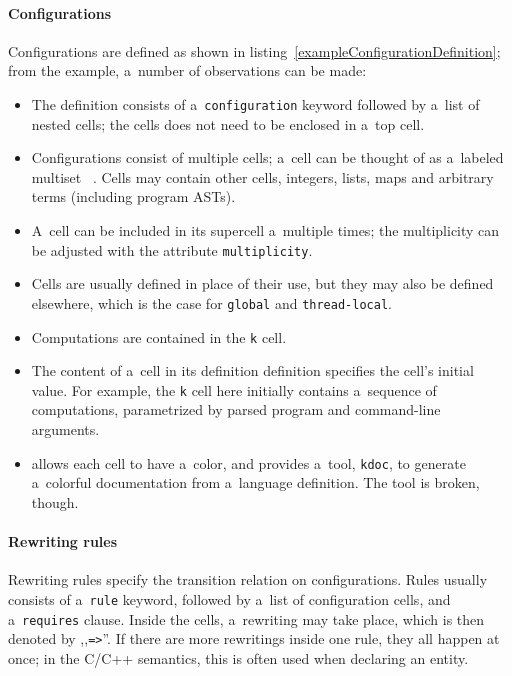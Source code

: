\documentclass{fithesis3}
\newcommand{\kdoc}{\texttt{kdoc}\xspace}
\begin{document}
\paragraph{Configurations}
Configurations are defined as shown in listing~\ref{exampleConfigurationDefinition}; from the example, a~number of observations can be made:
\begin{itemize}
\item The definition consists of a~\texttt{configuration} keyword followed by a~list of nested cells; the cells does not need to be enclosed in a~top cell.
\item Configurations consist of multiple cells; a~cell can be thought of as a~labeled multiset ~\cite{hathhorn-ellison-rosu-2015-pldi}. Cells may contain other cells, integers, lists, maps and arbitrary terms (including program ASTs).
\item A~cell can be included in its supercell a~multiple times; the multiplicity can be adjusted with the attribute \texttt{multiplicity}.
\item Cells are usually defined in place of their use, but they may also be defined elsewhere, which is the case for \texttt{global} and \texttt{thread-local}.
\item Computations are contained in the \texttt{k} cell.
\item The content of a~cell in its definition definition specifies the cell's initial value. For example, the \texttt{k} cell here initially contains a~sequence of computations, parametrized by parsed program and command-line arguments.
\item \K allows each cell to have a~color, and provides a~tool, \kdoc , to generate a~colorful documentation from a~language definition. The tool is broken, though.
\end{itemize}


\paragraph{Rewriting rules}
Rewriting rules specify the transition relation on configurations. Rules usually consists of a~\texttt{rule} keyword, followed by a~list of configuration cells, and a~\texttt{requires} clause. Inside the cells, a~rewriting may take place, which is then denoted by ,,\lstinline{=>}{}''. If there are more rewritings inside one rule, they all happen at once; in the C/C++ semantics, this is often used when declaring an entity.
\end{document}
